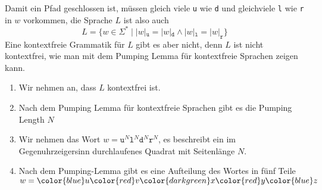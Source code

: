 \begin{loesung}
Damit ein Pfad geschlossen ist, müssen gleich viele 
\texttt{u} wie
\texttt{d} und
gleichviele
\texttt{l} wie \texttt{r} 
in $w$ vorkommen, die Sprache $L$ ist also auch
\begin{equation}
L=\{
w\in\Sigma^*
\;|\;
|w|_{\texttt{u}} = |w|_{\texttt{d}}
\wedge
|w|_{\texttt{l}} = |w|_{\texttt{r}}
\}
\label{40000073:cond}
\end{equation}
Eine kontextfreie Grammatik für $L$ gibt es aber nicht, denn
$L$ ist nicht kontextfrei, wie man mit dem Pumping Lemma für kontextfreie
Sprachen zeigen kann.

\begin{enumerate}
\item
Wir nehmen an, dass $L$ kontextfrei ist.
\item
Nach dem Pumping Lemma für kontextfreie Sprachen gibt es die
Pumping Length $N$
\item
Wir nehmen das Wort
$w= \texttt{u}^N \texttt{l}^N \texttt{d}^N \texttt{r}^N $,
es beschreibt ein im Gegenuhrzeigersinn durchlaufenes Quadrat mit
Seitenlänge $N$.
\item
Nach dem Pumping-Lemma gibt es eine Aufteilung des Wortes in
fünf Teile
$w=
{\color{blue}u}
{\color{red}v}
{\color{darkgreen}x}
{\color{red}y}
{\color{blue}z}$
\begin{center}
\end{center}
\end{enumerate}
\end{loesung}
